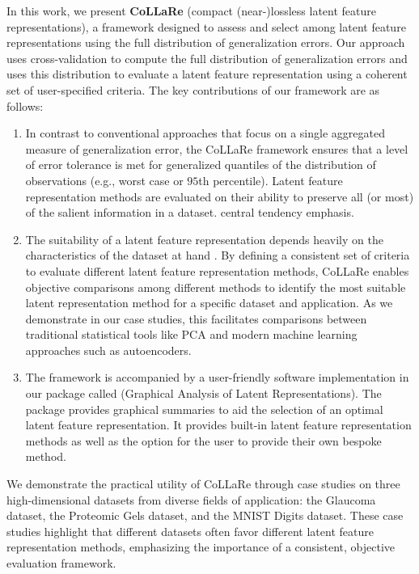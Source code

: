 In this work, we present \textbf{CoLLaRe} (compact (near-)lossless latent feature representations), a framework designed to assess and select among latent feature representations using the full distribution of generalization errors.
Our approach uses cross-validation to compute the full distribution of generalization errors and uses this distribution to evaluate a latent feature representation using a coherent set of user-specified criteria.
The key contributions of our framework are as follows:
\begin{enumerate}
    \item In contrast to conventional approaches that focus on a single aggregated measure of generalization error, the CoLLaRe framework ensures that a level of error tolerance is met for generalized quantiles of the distribution of observations (e.g., worst case or $95$th percentile). Latent feature representation methods are evaluated on their ability to preserve all (or most) of the salient information in a dataset. {\color{purple}central tendency emphasis.}
    \item The suitability of a latent feature representation depends heavily on the characteristics of the dataset at hand \parencite[Section 3, pp. 325--328]{morris_functional_2015}.
    By defining a consistent set of criteria to evaluate different latent feature representation methods, CoLLaRe enables objective comparisons among different methods to identify the most suitable latent representation method for a specific dataset and application.
    As we demonstrate in our case studies, this facilitates comparisons between traditional statistical tools like PCA and modern machine learning approaches such as autoencoders.
    \item The framework is accompanied by a user-friendly software implementation in our  package called  (Graphical Analysis of Latent Representations).
    The package provides graphical summaries to aid the selection of an optimal latent feature representation.
    It provides built-in latent feature representation methods as well as the option for the user to provide their own bespoke method.
\end{enumerate}
We demonstrate the practical utility of CoLLaRe through case studies on three high-dimensional datasets from diverse fields of application: the Glaucoma dataset, the Proteomic Gels dataset, and the MNIST Digits dataset.
These case studies highlight that different datasets often favor different latent feature representation methods, emphasizing the importance of a consistent, objective evaluation framework.


